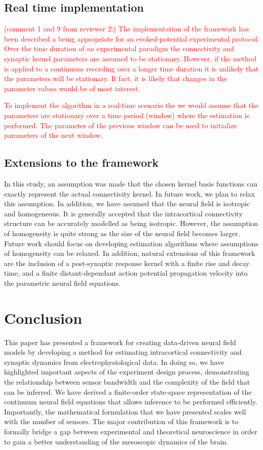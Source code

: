 \documentclass[review,authoryear,3p]{elsarticle}
\newcommand{\dean}[1]{\textcolor{red}{#1}}
\begin{document}
\subsection{Real time implementation}
\dean{(comment 1 and 9 from reviewer 2:) The implementation of the framework has been described a being appropriate for an evoked-potential experimental protocol. Over the time duration of an experimental paradigm the connectivity and synaptic kernel parameters are assumed to be stationary. However, if the method is applied to a continuous recording over a longer time duration it is unlikely that the parameters will be stationary. If fact, it is likely that changes in the parameter values would be of most interest.}
 
\dean{To implement the algorithm in a real-time scenario the we would assume that the parameters are stationary over a time period (window) where the estimation is performed. The parameter of the previous window can be used to initialize parameters of the next window.}

\subsection{Extensions to the framework}
In this study, an assumption was made that the chosen kernel basis functions can exactly represent the actual connectivity kernel. In future work, we plan to relax this assumption. In addition, we have assumed that the neural field is isotropic and homogeneous. It is generally accepted that the intracortical connectivity structure can be accurately modelled as being isotropic. However, the assumption of homogeneity is quite strong as the size of the neural field becomes larger. Future work should focus on developing estimation algorithms where assumptions of homogeneity can be relaxed. In addition, natural extensions of this framework are the inclusion of a post-synaptic response kernel with a finite rise and decay time, and a finite distant-dependant action potential propagation velocity into the parametric neural field equations.

\section{Conclusion}
This paper has presented a framework for creating data-driven neural field models by developing a method for estimating intracortical connectivity and synaptic dynamics from electrophysiological data. In doing so, we have highlighted important aspects of the experiment design process, demonstrating the relationship between sensor bandwidth and the complexity of the field that can be inferred. We have derived a finite-order state-space representation of the continuum neural field equations that allows inference to be performed efficiently. Importantly, the mathematical formulation that we have presented scales well with the number of sensors. The major contribution of this framework is to formally bridge a gap between experimental and theoretical neuroscience in order to gain a better understanding of the mesoscopic dynamics of the brain.
\end{document}

